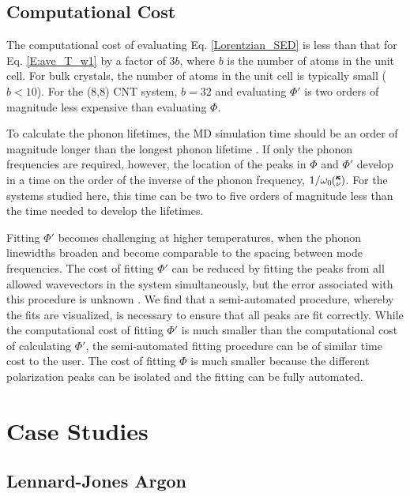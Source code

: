 \documentclass[12pt,twocolumn,iop]{/usr/share/texmf-texlive/tex/latex/iop/iopart}[/usr/share/texmf-texlive/tex/latex/iop/]
\newcommand{\kv}{\mspace{-4.0mu}\left(\mspace{-8.0mu}\begin{smallmatrix}&\pmb{\kappa} \\&\nu\end{smallmatrix}\mspace{-3.0mu}\right)}
\begin{document}
\subsection{\label{Subsection_Comp_Details_4}Computational Cost}

The computational cost of evaluating Eq. \eqref{Lorentzian_SED} is less than that for Eq$.$ \eqref{E:ave_T_w1} by a factor of $3b$, where $b$ is the number of atoms in the unit cell.  For bulk crystals, the number of atoms in the unit cell is typically small ($b<10$).  For the (8,8) CNT system, $b=32$ and evaluating $\Phi'$ is two orders of magnitude less expensive than evaluating $\Phi$.

To calculate the phonon lifetimes, the MD simulation time should be an order of magnitude longer than the longest phonon lifetime \cite{thomasthesis}.  If only the phonon frequencies are required, however, the location of the peaks in $\Phi$ and $\Phi'$ develop in a time on the order of the inverse of the phonon frequency, $1/\omega_0\kv$. For the systems studied here, this time can be two to five orders of magnitude less than the time needed to develop the lifetimes.

Fitting $\Phi'$ becomes challenging at higher temperatures, when the phonon linewidths broaden and become comparable to the spacing between mode frequencies. The cost of fitting $\Phi'$ can be reduced by fitting the peaks from all allowed wavevectors in the system simultaneously, but the error associated with this procedure is unknown \cite{shiomi2011a}. We find that a semi-automated procedure, whereby the fits are visualized, is necessary to ensure that all peaks are fit correctly.  While the computational cost of fitting $\Phi'$ is much smaller than the computational cost of calculating $\Phi'$, the semi-automated fitting procedure can be of similar time cost to the user. The cost of fitting $\Phi$ is much smaller because the different polarization peaks can be isolated and the fitting can be fully automated.

\section{\label{S:Section_Prop}Case Studies}

\subsection{\label{S:Subsection_prop_LJ}Lennard-Jones Argon}
\end{document}
